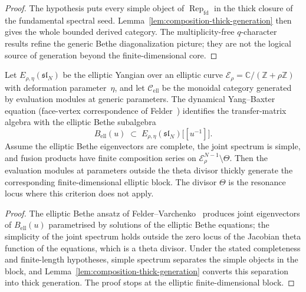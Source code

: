 \begin{proof}
The hypothesis puts every simple object of
\(\operatorname{Rep}_{\mathrm{fd}}\) in the thick closure of the
fundamental spectral seed. Lemma~\ref{lem:composition-thick-generation}
then gives the whole bounded derived category. The
multiplicity-free \(q\)-character results
\cite{Nakajima04,FrenkelMukhin01,ChariMoura06} refine the generic
Bethe diagonalization picture; they are not the logical source of
generation beyond the finite-dimensional core.
\end{proof}

\begin{proposition}
\label{prop:mc3-elliptic-theta-divisor-five-family}
Let $E_{\rho,\eta}(\mathfrak{sl}_N)$ be the elliptic Yangian over an
elliptic curve $\mathcal{E}_\rho = \mathbb{C}/(\mathbb{Z} + \rho\mathbb{Z})$
with deformation parameter~$\eta$, and let $\mathcal{C}_{\mathrm{ell}}$
be the monoidal category generated by evaluation modules at generic
parameters. The dynamical Yang--Baxter equation (face-vertex
correspondence of Felder~\cite{FelderVarchenko96}) identifies the
transfer-matrix algebra with the elliptic Bethe subalgebra
\[
 B_{\mathrm{ell}}(u) \;\subset\;
 E_{\rho,\eta}(\mathfrak{sl}_N)\big[[u^{-1}]\big].
\]
Assume the elliptic Bethe eigenvectors are complete, the joint
spectrum is simple, and fusion products have finite composition
series on
\(\mathcal{E}_\rho^{N-1}\setminus\Theta\). Then the evaluation
modules at parameters outside the theta divisor thickly generate the
corresponding finite-dimensional elliptic block. The divisor
\(\Theta\) is the resonance locus where this criterion does not
apply.
\end{proposition}

\begin{proof}
The elliptic Bethe ansatz of Felder--Varchenko~\cite{FelderVarchenko96}
produces joint eigenvectors of $B_{\mathrm{ell}}(u)$ parametrised by
solutions of the elliptic Bethe equations; the simplicity of the joint
spectrum holds outside the zero locus of the Jacobian theta function
of the equations, which is a theta divisor. Under the stated
completeness and finite-length hypotheses, simple spectrum separates
the simple objects in the block, and Lemma~\ref{lem:composition-thick-generation}
converts this separation into thick generation. The proof stops at
the elliptic finite-dimensional block.
\end{proof}

